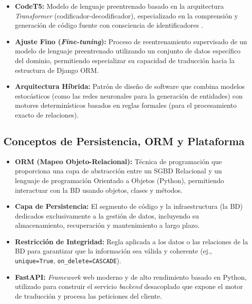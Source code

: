\begin{itemize}
    \item \textbf{CodeT5:} Modelo de lenguaje preentrenado basado en la arquitectura \textit{Transformer} (codificador-decodificador), especializado en la comprensión y generación de código fuente con consciencia de identificadores \cite{wang2021codet5}.
    \item \textbf{Ajuste Fino (\textit{Fine-tuning}):} Proceso de reentrenamiento supervisado de un modelo de lenguaje preentrenado utilizando un conjunto de datos específico del dominio, permitiendo especializar su capacidad de traducción hacia la estructura de Django ORM.
    \item \textbf{Arquitectura Híbrida:} Patrón de diseño de software que combina modelos estocásticos (como las redes neuronales para la generación de entidades) con motores determinísticos basados en reglas formales (para el procesamiento exacto de relaciones).
\end{itemize}

\subsection{Conceptos de Persistencia, ORM y Plataforma}
\label{subsec:def-persistencia-orm}

\begin{itemize}
    \item \textbf{ORM (Mapeo Objeto-Relacional):} Técnica de programación que proporciona una capa de abstracción entre un SGBD Relacional y un lenguaje de programación Orientado a Objetos (Python), permitiendo interactuar con la BD usando objetos, clases y métodos.
    \item \textbf{Capa de Persistencia:} El segmento de código y la infraestructura (la BD) dedicados exclusivamente a la gestión de datos, incluyendo su almacenamiento, recuperación y mantenimiento a largo plazo.
    \item \textbf{Restricción de Integridad:} Regla aplicada a los datos o las relaciones de la BD para garantizar que la información sea válida y coherente (ej., \texttt{unique=True}, \texttt{on\_delete=CASCADE}).
    \item \textbf{FastAPI:} \textit{Framework} web moderno y de alto rendimiento basado en Python, utilizado para construir el servicio \textit{backend} desacoplado que expone el motor de traducción y procesa las peticiones del cliente.
\end{itemize}

